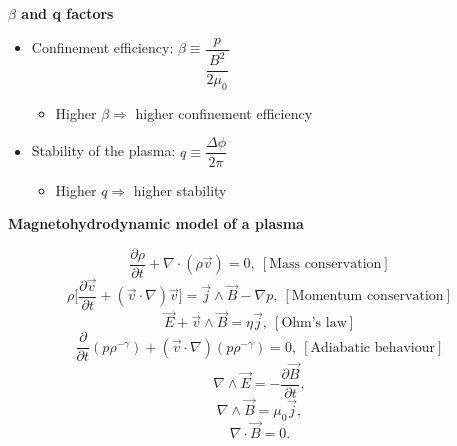 \documentclass[10pt]{beamer}
\newcommand{\p}{\partial}
\begin{document}
\begin{frame}{\bf $\beta$ and q factors}
	\begin{minipage}{0.4\textwidth}
		\begin{itemize}
			\item Confinement efficiency: $\beta \equiv \dfrac{p}{\dfrac{B^2}{2\mu_0}}$
			\begin{itemize}
				\item Higher $\beta \Rightarrow$ higher confinement efficiency
			\end{itemize}
			\item Stability of the plasma: $q \equiv \dfrac{\Delta \phi}{2 \pi}$
			\begin{itemize}
				\item Higher $q \Rightarrow$ higher stability
			\end{itemize}

		\end{itemize}
	\end{minipage}
%
%
	\begin{minipage}{0.5\textwidth}
		\begin{figure}
		\centering
		\end{figure}
	\end{minipage}
\end{frame}



\begin{frame}{\bf Magnetohydrodynamic model of a plasma}

\begin{equation}
\dfrac{\p \rho}{\p t}+\nabla \cdot (\rho \vec{v})=0, \ [\text{Mass conservation}] 
\end{equation}
\begin{equation} \label{momentum cons}
\rho \Big[\dfrac{\p \vec{v}}{\p t}+(\vec{v} \cdot \nabla)\vec{v} \Big]=\vec{j} \wedge \vec{B} -\nabla p, \ [\text{Momentum  conservation}] 
\end{equation}
\begin{equation}
\vec{E} +\vec{v} \wedge \vec{B}=\eta \vec{j}, \  [\text{Ohm's  law}] 
 \end{equation}
 \begin{equation}
\dfrac{\p}{\p t}(p \rho^{-\gamma})+(\vec{v} \cdot \nabla) (p \rho^{-\gamma})=0, \ [\text{Adiabatic  behaviour}] 
\end{equation}
\begin{equation} \label{faraday}
\nabla \wedge \vec{E}=- \dfrac{\p \vec{B}}{\p t},  
\end{equation}
\begin{equation}\label{ampere}
\nabla \wedge \vec{B}=\mu_0 \vec{j}, 
\end{equation}
\begin{equation} \label{nablaBnulo}
\nabla \cdot \vec{B}=0. 
\end{equation}

\end{frame}
\end{document}
